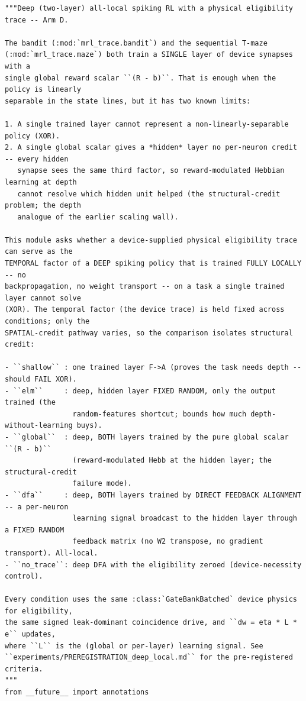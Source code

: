 \begin{lstlisting}[caption={mrl\_trace/deep.py},label={lst:siox-src-deep}]
"""Deep (two-layer) all-local spiking RL with a physical eligibility trace -- Arm D.

The bandit (:mod:`mrl_trace.bandit`) and the sequential T-maze
(:mod:`mrl_trace.maze`) both train a SINGLE layer of device synapses with a
single global reward scalar ``(R - b)``. That is enough when the policy is linearly
separable in the state lines, but it has two known limits:

1. A single trained layer cannot represent a non-linearly-separable policy (XOR).
2. A single global scalar gives a *hidden* layer no per-neuron credit -- every hidden
   synapse sees the same third factor, so reward-modulated Hebbian learning at depth
   cannot resolve which hidden unit helped (the structural-credit problem; the depth
   analogue of the earlier scaling wall).

This module asks whether a device-supplied physical eligibility trace can serve as the
TEMPORAL factor of a DEEP spiking policy that is trained FULLY LOCALLY -- no
backpropagation, no weight transport -- on a task a single trained layer cannot solve
(XOR). The temporal factor (the device trace) is held fixed across conditions; only the
SPATIAL-credit pathway varies, so the comparison isolates structural credit:

- ``shallow`` : one trained layer F->A (proves the task needs depth -- should FAIL XOR).
- ``elm``     : deep, hidden layer FIXED RANDOM, only the output trained (the
                random-features shortcut; bounds how much depth-without-learning buys).
- ``global``  : deep, BOTH layers trained by the pure global scalar ``(R - b)``
                (reward-modulated Hebb at the hidden layer; the structural-credit
                failure mode).
- ``dfa``     : deep, BOTH layers trained by DIRECT FEEDBACK ALIGNMENT -- a per-neuron
                learning signal broadcast to the hidden layer through a FIXED RANDOM
                feedback matrix (no W2 transpose, no gradient transport). All-local.
- ``no_trace``: deep DFA with the eligibility zeroed (device-necessity control).

Every condition uses the same :class:`GateBankBatched` device physics for eligibility,
the same signed leak-dominant coincidence drive, and ``dw = eta * L * e`` updates,
where ``L`` is the (global or per-layer) learning signal. See
``experiments/PREREGISTRATION_deep_local.md`` for the pre-registered criteria.
"""
from __future__ import annotations


\end{lstlisting}
